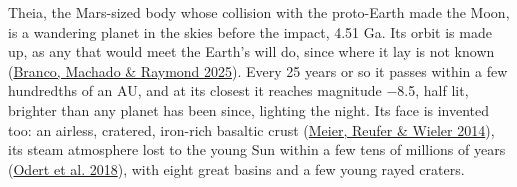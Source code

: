 \documentclass[9pt,twocolumn]{extarticle}
\begin{document}
Theia, the Mars-sized body whose collision with the proto-Earth made the Moon, is a wandering planet in the skies before the impact, 4.51 Ga. Its orbit is made up, as any that would meet the Earth's will do, since where it lay is not known (\protect\hyperlink{cite.branco2025}{Branco, Machado \& Raymond 2025}). Every 25 years or so it passes within a few hundredths of an AU, and at its closest it reaches magnitude $-$8.5, half lit, brighter than any planet has been since, lighting the night. Its face is invented too: an airless, cratered, iron-rich basaltic crust (\protect\hyperlink{cite.meier2014}{Meier, Reufer \& Wieler 2014}), its steam atmosphere lost to the young Sun within a few tens of millions of years (\protect\hyperlink{cite.odert2018}{Odert et al. 2018}), with eight great basins and a few young rayed craters.
\end{document}

